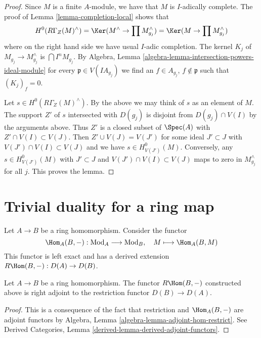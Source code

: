 \begin{proof}
Since $M$ is a finite $A$-module, we have that $M$ is $I$-adically complete.
The proof of Lemma \ref{lemma-completion-local} shows that
$$
H^0(R\Gamma_Z(M)^\wedge) =
\Ker(M^\wedge \to \prod M_{g_j}^\wedge) =
\Ker(M \to \prod M_{g_j}^\wedge)
$$
where on the right hand side we have usual $I$-adic completion.
The kernel $K_j$ of $M_{g_j} \to M_{g_j}^\wedge$ is $\bigcap I^n M_{g_j}$.
By Algebra, Lemma \ref{algebra-lemma-intersection-powers-ideal-module}
for every $\mathfrak p \in V(IA_{g_j})$ we find an
$f \in A_{g_j}$, $f \not \in \mathfrak p$ such that $(K_j)_f = 0$.

\medskip\noindent
Let $s \in H^0(R\Gamma_Z(M)^\wedge)$.
By the above we may think of $s$ as an element of $M$.
The support $Z'$ of $s$ intersected with $D(g_j)$ is disjoint from
$D(g_j) \cap V(I)$ by the arguments above.
Thus $Z'$ is a closed subset of $\Spec(A)$ with $Z' \cap V(I) \subset V(J)$.
Then $Z' \cup V(J) = V(J')$ for some ideal $J' \subset J$ with
$V(J') \cap V(I) \subset V(J)$ and we have $s \in H^0_{V(J')}(M)$.
Conversely, any $s \in H^0_{V(J')}(M)$ with $J' \subset J$ and
$V(J') \cap V(I) \subset V(J)$ maps to zero in $M_{g_j}^\wedge$ for all $j$.
This proves the lemma.
\end{proof}









\section{Trivial duality for a ring map}
\label{section-trivial}

\noindent
Let $A \to B$ be a ring homomorphism. Consider the functor
$$
\Hom_A(B, -) : \text{Mod}_A \longrightarrow \text{Mod}_B,\quad
M \longmapsto \Hom_A(B, M)
$$
This functor is left exact and has a derived extension
$R\Hom(B, -) : D(A) \to D(B)$.

\begin{lemma}
\label{lemma-right-adjoint}
Let $A \to B$ be a ring homomorphism. The functor $R\Hom(B, -)$
constructed above is right adjoint to the restriction functor
$D(B) \to D(A)$.
\end{lemma}

\begin{proof}
This is a consequence of the fact that restriction and $\Hom_A(B, -)$ are
adjoint functors by Algebra, Lemma \ref{algebra-lemma-adjoint-hom-restrict}.
See Derived Categories, Lemma \ref{derived-lemma-derived-adjoint-functors}.
\end{proof}

